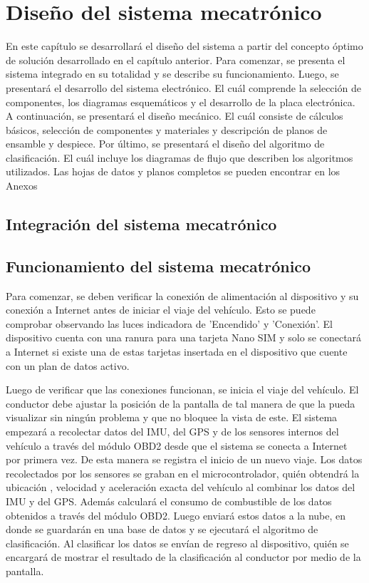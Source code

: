  \chapter{Diseño del sistema mecatrónico }

 En este capítulo se desarrollará el diseño del sistema a partir del concepto óptimo de solución desarrollado en el capítulo anterior. Para comenzar, se presenta el sistema integrado en su totalidad y se describe su funcionamiento. Luego, se presentará el desarrollo del sistema electrónico. El cuál comprende la selección de componentes, los diagramas esquemáticos y el desarrollo de la placa electrónica. A continuación, se presentará el diseño mecánico. El cuál consiste de cálculos básicos, selección de componentes y materiales y descripción de planos de ensamble y despiece. Por último, se presentará el diseño del algoritmo de clasificación. El cuál incluye los diagramas de flujo que describen los algoritmos utilizados. Las hojas de datos y planos completos se pueden encontrar en los Anexos

 \graphicspath{{Chapter4/Figuras/}{Chapter4/Figs/PDF/}{Chapter4/Figs/}}

\section{Integración del sistema mecatrónico}


\section{Funcionamiento del sistema mecatrónico}
Para comenzar, se deben verificar la conexión de alimentación al dispositivo y su conexión a Internet antes de iniciar el viaje del vehículo. Esto se puede comprobar observando las luces indicadora de 'Encendido' y 'Conexión'. El dispositivo cuenta con una ranura para una tarjeta Nano SIM y solo se conectará a Internet si existe una de estas tarjetas insertada en el dispositivo que cuente con un plan de datos activo.

Luego de verificar que las conexiones funcionan, se inicia el viaje del vehículo. El conductor debe ajustar la posición de la pantalla de tal manera de que la pueda visualizar sin ningún problema y que no bloquee la vista de este. El sistema empezará a recolectar datos del IMU, del GPS y de los sensores internos del vehículo a través del módulo OBD2 desde que el sistema se conecta a Internet por primera vez. De esta manera se registra el inicio de un nuevo viaje. Los datos recolectados por los sensores se graban en el microcontrolador, quién obtendrá la ubicación , velocidad y aceleración exacta del vehículo al combinar los datos del IMU y del GPS. Además calculará el consumo de combustible de los datos obtenidos a través del módulo OBD2. Luego enviará estos datos a la nube, en donde se guardarán en una base de datos y se ejecutará el algoritmo de clasificación. Al clasificar los datos se envían de regreso al dispositivo, quién se encargará de mostrar el resultado de la clasificación al conductor por medio de la pantalla.

